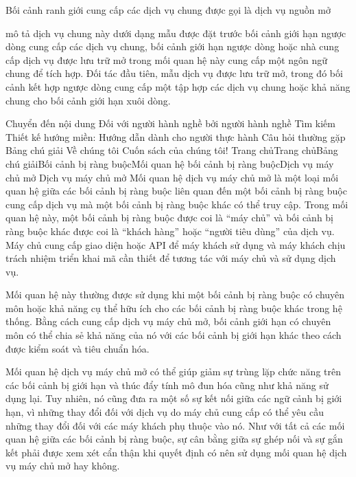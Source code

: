 
Bối cảnh ranh giới cung cấp các dịch vụ chung được gọi là dịch vụ nguồn mở

mô tả dịch vụ chung này dưới dạng mẫu được đặt trước bối cảnh giới hạn ngược dòng cung cấp các dịch vụ chung, bối cảnh giới hạn ngược dòng hoặc nhà cung cấp dịch vụ được lưu trữ mở trong mối quan hệ này cung cấp một ngôn ngữ chung để tích hợp.
Đối tác đầu tiên, mẫu dịch vụ được lưu trữ mở, trong đó bối cảnh kết hợp ngược dòng cung cấp một tập hợp các dịch vụ chung hoặc khả năng chung cho bối cảnh giới hạn xuôi dòng.




Chuyển đến nội dung
Đối với người hành nghề bởi người hành nghề
Tìm kiếm
Thiết kế hướng miền: Hướng dẫn dành cho người thực hành
Câu hỏi thường gặp
Bảng chú giải
Về chúng tôi
Cuốn sách của chúng tôi!
Trang chủTrang chủBảng chú giảiBối cảnh bị ràng buộcMối quan hệ bối cảnh bị ràng buộcDịch vụ máy chủ mở
Dịch vụ máy chủ mở
Mối quan hệ dịch vụ máy chủ mở là một loại mối quan hệ giữa các bối cảnh bị ràng buộc liên quan đến một bối cảnh bị ràng buộc cung cấp dịch vụ mà một bối cảnh bị ràng buộc khác có thể truy cập. Trong mối quan hệ này, một bối cảnh bị ràng buộc được coi là “máy chủ” và bối cảnh bị ràng buộc khác được coi là “khách hàng” hoặc “người tiêu dùng” của dịch vụ. Máy chủ cung cấp giao diện hoặc API để máy khách sử dụng và máy khách chịu trách nhiệm triển khai mã cần thiết để tương tác với máy chủ và sử dụng dịch vụ.

Mối quan hệ này thường được sử dụng khi một bối cảnh bị ràng buộc có chuyên môn hoặc khả năng cụ thể hữu ích cho các bối cảnh bị ràng buộc khác trong hệ thống. Bằng cách cung cấp dịch vụ máy chủ mở, bối cảnh giới hạn có chuyên môn có thể chia sẻ khả năng của nó với các bối cảnh bị giới hạn khác theo cách được kiểm soát và tiêu chuẩn hóa.

Mối quan hệ dịch vụ máy chủ mở có thể giúp giảm sự trùng lặp chức năng trên các bối cảnh bị giới hạn và thúc đẩy tính mô đun hóa cũng như khả năng sử dụng lại. Tuy nhiên, nó cũng đưa ra một số sự kết nối giữa các ngữ cảnh bị giới hạn, vì những thay đổi đối với dịch vụ do máy chủ cung cấp có thể yêu cầu những thay đổi đối với các máy khách phụ thuộc vào nó. Như với tất cả các mối quan hệ giữa các bối cảnh bị ràng buộc, sự cân bằng giữa sự ghép nối và sự gắn kết phải được xem xét cẩn thận khi quyết định có nên sử dụng mối quan hệ dịch vụ máy chủ mở hay không.

